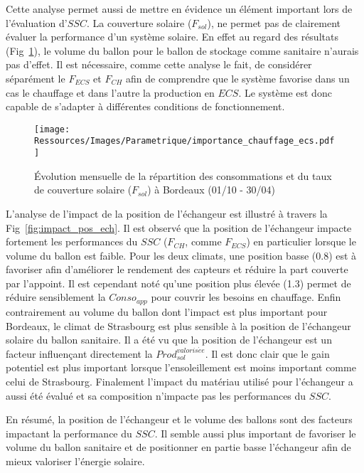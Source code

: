 Cette analyse permet aussi de mettre en évidence un élément important lors de l’évaluation
d’$SSC$. La couverture solaire ($F_{sol}$), ne permet pas de clairement évaluer la
performance d’un système solaire. En effet au regard des résultats (Fig~\ref{fig:importance_chauffage_ecs}),
le volume du ballon pour le ballon de stockage comme sanitaire n’aurais pas d’effet.
Il est nécessaire, comme cette analyse le fait, de considérer séparément le $F_{ECS}$
et $F_{CH}$ afin de comprendre que le système favorise dans un cas le chauffage et dans
l’autre la production en $ECS$. Le système est donc capable de s’adapter à différentes
conditions de fonctionnement.


\begin{figure}
    \begin{center}
        \texttt{[image: Ressources/Images/Parametrique/importance\_chauffage\_ecs.pdf]}
    \end{center}
    \caption{Évolution mensuelle de la répartition des consommations et du taux
             de couverture solaire ($F_{sol}$) à Bordeaux (01/10 - 30/04)
             \label{fig:importance_chauffage_ecs}}
\end{figure}


L’analyse de l’impact de la position de l’échangeur est illustré à travers la Fig~\ref{fig:impact_pos_ech}.
Il est observé que la position de l’échangeur impacte fortement les performances du $SSC$
($F_{CH}$, comme $F_{ECS}$) en particulier lorsque le volume du ballon est faible. Pour les deux climats, une position
basse (\num{0.8}) est à favoriser afin d’améliorer le rendement des capteurs et réduire la part
couverte par l’appoint. Il est cependant noté qu’une position plus élevée (\num{1.3}) permet
de réduire sensiblement la $Conso_{app}$ pour couvrir les besoins en
chauffage. Enfin contrairement au volume du ballon dont l’impact est plus important
pour Bordeaux, le climat de Strasbourg est plus sensible à la position de l’échangeur
solaire du ballon sanitaire. Il a été vu que la position de l’échangeur est un facteur
influençant directement la $Prod_{sol}^{valoris\acute ee}$. Il est donc
clair que le gain potentiel est plus important lorsque l’ensoleillement est moins
important comme celui de Strasbourg. Finalement l’impact du matériau utilisé pour l’échangeur
a aussi été évalué et sa composition n’impacte pas les performances du $SSC$.

En résumé, la position de l’échangeur et le volume des ballons sont des facteurs
impactant la performance du $SSC$. Il semble aussi plus important de favoriser
le volume du ballon sanitaire et de positionner en partie basse l’échangeur afin
de mieux valoriser l’énergie solaire.

